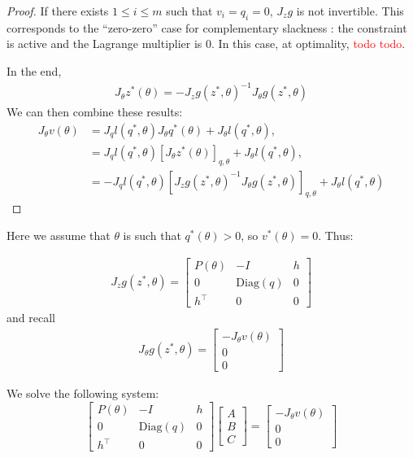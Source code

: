 \begin{proof}
If there exists $1 \leq i\leq m$ such that $v_i = q_i = 0$, $J_z g$ is not invertible. This corresponds to the ``zero-zero'' case for complementary slackness : the constraint is active and the Lagrange multiplier is $0$. In this case, at optimality, \textcolor{red}{todo todo}.


In the end,
\begin{align}
    J_\theta z^*(\theta) = - J_zg(z^*, \theta)^{-1}J_\theta g(z^*, \theta)
\end{align}
We can then combine these results:
\begin{align}
J_\theta v(\theta) &=  J_q l(q^*, \theta)J_\theta q^*(\theta) + J_\theta l(q^*, \theta),\\
&= J_q l(q^*, \theta)  \left[J_\theta z^*(\theta)\right]_{q, \theta} + J_\theta l(q^*, \theta),\\
&= - J_ql(q^*, \theta) \left[J_z g(z^*, \theta)^{-1} J_\theta g(z^*, \theta)\right]_{q,\theta}+ J_\theta l(q^*, \theta)
\end{align}
\end{proof}

Here we assume that $\theta$ is such that $q^*(\theta) > 0 $, so $v^*(\theta)=0$. Thus:

\begin{align}
    J_z g(z^*, \theta) = \begin{bmatrix}
    P(\theta) & - I & h\\
    0 & \mathrm{Diag}(q)& 0\\
    h^\top  & 0 & 0
    \end{bmatrix}
\end{align}
 and recall
\begin{align}
    J_\theta g(z^*, \theta) = \begin{bmatrix}
    -J_\theta v(\theta)\\
    0 \\
    0
    \end{bmatrix}
\end{align}

We solve the following system:
\begin{equation}
\begin{bmatrix}
    P(\theta) & - I & h\\
    0 & \mathrm{Diag}(q)& 0\\
    h^\top  & 0 & 0
    \end{bmatrix}
\begin{bmatrix}
    A \\
    B \\
    C
    \end{bmatrix} =
\begin{bmatrix}
    - J_\theta v(\theta) \\
    0 \\
    0
    \end{bmatrix}
\end{equation}

